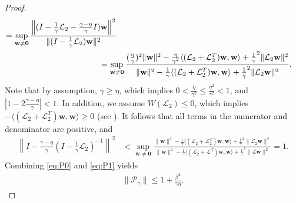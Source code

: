 \documentclass[a4paper,10pt]{article}
\begin{document}
{\begin{proof}
\begin{align*}
= \sup_{\mathbf{w}\neq\mathbf{0}} \frac{\left\| (I - \tfrac{1}{\gamma}\mathcal{L}_2 -
		\frac{\gamma-\eta}{\gamma}I )\mathbf{w}\right\|^2}{\|(I - \tfrac{1}{\gamma}\mathcal{L}_2)
		\mathbf{w}\|^2} \\
&\hspace{-5ex} = \sup_{\mathbf{w}\neq\mathbf{0}} \frac{(\tfrac{\eta}{\gamma})^2\|\mathbf{w}\|^2
	- \tfrac{\eta}{\gamma^2}\langle (\mathcal{L}_2 + \mathcal{L}_2^T)
		\mathbf{w},\mathbf{w}\rangle + \tfrac{1}{\gamma}^2\|\mathcal{L}_2\mathbf{w}\|^2}
	{\|\mathbf{w}\|^2 - \tfrac{1}{\gamma}\langle (\mathcal{L}_2 + \mathcal{L}_2^T)
		\mathbf{w},\mathbf{w}\rangle + \tfrac{1}{\gamma}^2\|\mathcal{L}_2\mathbf{w}\|^2}.
\end{align*}
%
Note that by assumption, $\gamma \geq \eta$, which implies
$0< \tfrac{\eta}{\gamma^2} \leq \tfrac{\eta^2}{\gamma^2}  < 1$, and 
$|1 - 2\tfrac{\gamma-\eta}{\gamma}| < 1$. In addition, we assume $W(\mathcal{L}_2)\leq 0$,
which implies $-\langle (\mathcal{L}_2+\mathcal{L}_2^T)\mathbf{w},\mathbf{w}\rangle \geq 0$
(see ). It follows that all terms in the numerator and denominator are
positive, and
%
\begin{align} \label{eq:P1}
\left\| I - \tfrac{\gamma-\eta}
	{\gamma}(I - \tfrac{1}{\gamma}\mathcal{L}_2)^{-1}\right\|^2
& < \sup_{\mathbf{w}\neq\mathbf{0}} \frac{\|\mathbf{w}\|^2
	- \tfrac{1}{\gamma}\langle (\mathcal{L}_2 + \mathcal{L}_2^T)
		\mathbf{w},\mathbf{w}\rangle + \tfrac{1}{\gamma}^2\|\mathcal{L}_2\mathbf{w}\|^2}
	{\|\mathbf{w}\|^2 - \tfrac{1}{\gamma}\langle (\mathcal{L}_2 + \mathcal{L}^T)
		\mathbf{w},\mathbf{w}\rangle + \tfrac{1}{\gamma}^2\|\mathcal{L}\mathbf{w}\|^2} 
= 1.
\end{align}
%
Combining \eqref{eq:P0} and \eqref{eq:P1} yields
%
\begin{align}\label{eq:Pgamma_gen}
\|\mathcal{P}_\gamma\| \leq 1 + \frac{\beta^2}{\gamma\eta}.
\end{align}


\end{proof}}
\end{document}
